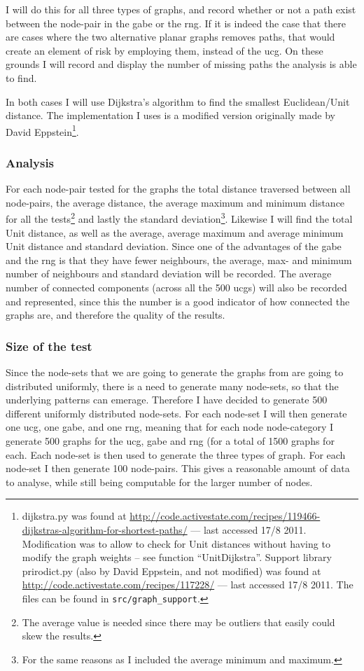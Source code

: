 I will do this for all three types of graphs, and record whether or not a path exist between the node-pair in the \ac{gabe} or the \ac{rng}. If it is indeed the case that there are cases where the two alternative planar graphs removes paths, that would create an element of risk by employing them, instead of the \ac{ucg}. On these grounds I will record and display the number of missing paths the analysis is able to find.

In both cases I will use Dijkstra's algorithm to find the smallest Euclidean/Unit distance. The implementation I uses is a modified version originally made by David Eppstein\footnote{dijkstra.py was found at \url{http://code.activestate.com/recipes/119466-dijkstras-algorithm-for-shortest-paths/} --- last accessed 17/8 2011. Modification was to allow to check for Unit distances without having to modify the graph weights -- see function ``UnitDijkstra''. Support library prirodict.py (also by David Eppstein, and not modified) was found at \url{http://code.activestate.com/recipes/117228/} --- last accessed 17/8 2011. The files can be found in \texttt{src/graph\_support}.}.

\subsubsection{Analysis}
For each node-pair tested for the graphs the total distance traversed between all node-pairs, the average distance, the average maximum and minimum distance for all the tests\footnote{The average value is needed since there may be outliers that easily could skew the results.} and lastly the standard deviation\footnote{For the same reasons as I included the average minimum and maximum.}. Likewise I will find the total Unit distance, as well as the average, average maximum and average minimum Unit distance and standard deviation. Since one of the advantages of the \ac{gabe} and the \ac{rng} is that they have fewer neighbours, the average, max- and minimum number of neighbours and standard deviation will be recorded. The average number of connected components (across all the 500 \acp{ucg}) will also be recorded and represented, since this the number is a good indicator of how connected the graphs are, and therefore the quality of the results.

\subsubsection{Size of the test}
Since the node-sets that we are going to generate the graphs from are going to distributed uniformly, there is a need to generate many node-sets, so that the underlying patterns can emerage. Therefore I have decided to generate 500 different uniformly distributed node-sets. For each node-set I will then generate one \ac{ucg}, one \ac{gabe}, and one \ac{rng}, meaning that for each node node-category I  generate 500 graphs for the \ac{ucg}, \ac{gabe} and \ac{rng} (for a total of 1500 graphs for each. Each node-set is then used to generate the three types of graph. For each node-set I then generate 100 node-pairs. This gives a reasonable amount of data to analyse, while still being computable for the larger number of nodes.
